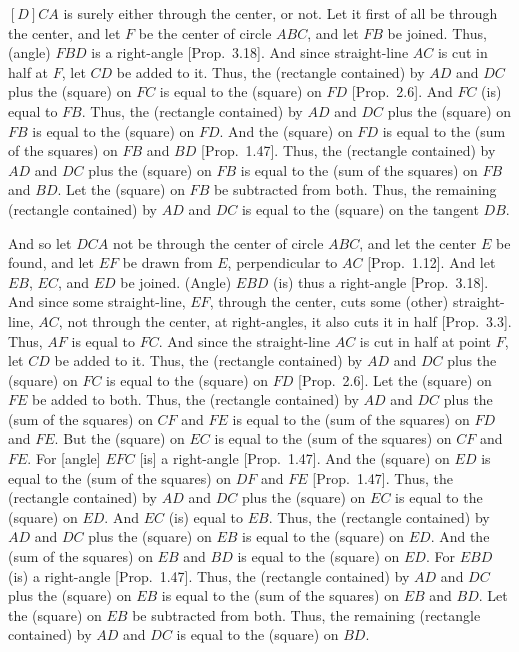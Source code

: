 \begin{Parallel}{}{}
{\epsfysize=1.8in
\centerline{}

$[D]CA$ is surely either through the center, or not. Let it first of all be
through the center, and let $F$ be the center of circle $ABC$, and let 
$FB$ be joined. Thus, (angle) $FBD$ is a right-angle [Prop.~3.18].
And since straight-line $AC$ is cut in half at $F$, let $CD$ be added to it.
Thus, the (rectangle contained) by $AD$ and $DC$ plus the (square) on $FC$ is
equal to the (square) on $FD$ [Prop.~2.6]. And $FC$ (is) equal to $FB$.
Thus, the (rectangle contained) by $AD$ and $DC$ plus the (square) on $FB$
is equal to the (square) on $FD$. And the (square) on $FD$ is equal to
the (sum of the squares) on $FB$ and $BD$ [Prop.~1.47]. Thus, the
(rectangle contained) by $AD$ and $DC$ plus the (square) on $FB$ is equal
to the (sum of the squares) on $FB$ and $BD$. Let the (square) on $FB$ be subtracted
from both. Thus, the remaining (rectangle contained) by $AD$ and $DC$ 
is equal to the (square) on the tangent $DB$.

And so let $DCA$ not be through the center of circle $ABC$, and let the center $E$
be found, and let $EF$ be drawn from $E$, perpendicular to
$AC$ [Prop.~1.12]. And let $EB$, $EC$, and $ED$ be joined. (Angle)
$EBD$ (is) thus a right-angle [Prop.~3.18]. And since some straight-line, $EF$, through the
center, cuts some (other) straight-line, $AC$, not through the center, at
right-angles, it also cuts it in half [Prop.~3.3]. Thus, $AF$ is equal to
$FC$. And since the straight-line $AC$ is cut in half at point $F$, let $CD$ 
be added to it. Thus, the (rectangle contained) by $AD$ and
 $DC$ plus the
(square) on $FC$ is equal to the (square) on $FD$ [Prop.~2.6]. Let
the (square) on $FE$ be added to both. Thus, the (rectangle contained)
by $AD$ and $DC$ plus the (sum of the squares) on $CF$ and $FE$ is equal to
the (sum of the squares) on $FD$ and $FE$. But  the (square) on $EC$  is equal to the (sum of the squares)
on $CF$ and $FE$. For [angle] $EFC$ [is] a
right-angle [Prop.~1.47]. And the (square) on $ED$ is equal to the (sum of the squares) on $DF$ and
$FE$   [Prop.~1.47]. Thus, the (rectangle
contained) by $AD$ and $DC$ plus the (square) on $EC$ is equal to the (square)
on $ED$. And $EC$ (is) equal to $EB$. Thus, the (rectangle
contained) by $AD$ and $DC$ plus the (square) on $EB$ is equal to the (square)
on $ED$. And the (sum of the squares) on 
$EB$ and $BD$  is equal to  the (square) on $ED$. For $EBD$ (is) a right-angle [Prop.~1.47]. Thus, the (rectangle
contained) by $AD$ and $DC$ plus the (square) on $EB$ is equal to the (sum of the squares)
on $EB$ and $BD$. Let the (square) on $EB$ be subtracted from both. Thus, the remaining
(rectangle contained) by $AD$ and $DC$ is equal to the (square) on $BD$.

}
\end{Parallel}
